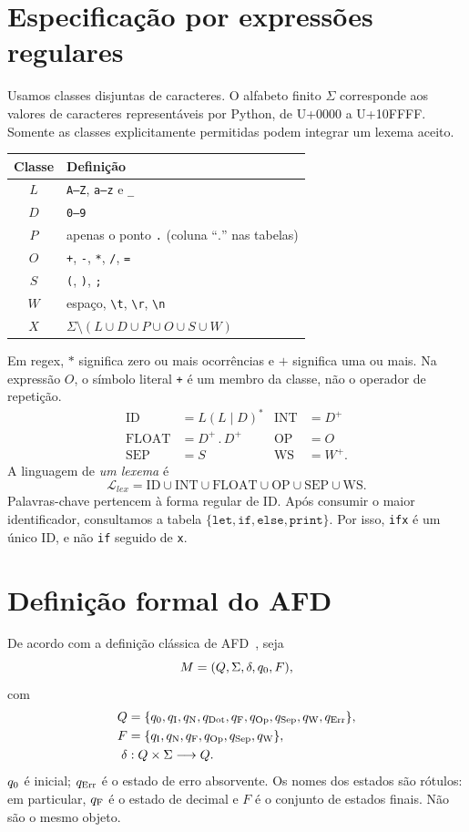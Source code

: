 \documentclass[12pt,a4paper]{article}
\begin{document}
\section{Especificação por expressões regulares}
Usamos classes disjuntas de caracteres. O alfabeto finito $\Sigma$ corresponde
aos valores de caracteres representáveis por Python, de U+0000 a U+10FFFF.
Somente as classes explicitamente permitidas podem integrar um lexema aceito.
\begin{center}
\begin{tabular}{cl}
\toprule Classe & Definição\\\midrule
$L$ & \texttt{A--Z}, \texttt{a--z} e \texttt{\_}\\
$D$ & \texttt{0--9}\\
$P$ & apenas o ponto \texttt{.} (coluna ``$.$'' nas tabelas)\\
$O$ & \texttt{+}, \texttt{-}, \texttt{*}, \texttt{/}, \texttt{=}\\
$S$ & \texttt{(}, \texttt{)}, \texttt{;}\\
$W$ & espaço, \texttt{\textbackslash t}, \texttt{\textbackslash r}, \texttt{\textbackslash n}\\
$X$ & $\Sigma\setminus(L\cup D\cup P\cup O\cup S\cup W)$\\\bottomrule
\end{tabular}
\end{center}
Em regex, $*$ significa zero ou mais ocorrências e $+$ significa uma ou mais.
Na expressão $O$, o símbolo literal \texttt{+} é um membro da classe, não o
operador de repetição.
\begin{align*}
\mathrm{ID}&=L(L\mid D)^* &\mathrm{INT}&=D^+\\
\mathrm{FLOAT}&=D^+\,\texttt{.}\,D^+ &\mathrm{OP}&=O\\
\mathrm{SEP}&=S &\mathrm{WS}&=W^+.
\end{align*}
A linguagem de \emph{um lexema} é
\[
\mathcal{L}_{lex}=\mathrm{ID}\cup\mathrm{INT}\cup\mathrm{FLOAT}
\cup\mathrm{OP}\cup\mathrm{SEP}\cup\mathrm{WS}.
\]
Palavras-chave pertencem à forma regular de ID. Após consumir o maior
identificador, consultamos a tabela
$\{\texttt{let},\texttt{if},\texttt{else},\texttt{print}\}$.
Por isso, \texttt{ifx} é um único ID, e não \texttt{if} seguido de \texttt{x}.

\section{Definição formal do AFD}
De acordo com a definição clássica de AFD~\cite{sipser}, seja
\[
M=(Q,\Sigma,\delta,q_{\mathrm{0}},F),
\]
com
\begin{align*}
Q&=\{q_{\mathrm{0}},q_{\mathrm{I}},q_{\mathrm{N}},q_{\mathrm{Dot}},q_{\mathrm{F}},q_{\mathrm{Op}},q_{\mathrm{Sep}},q_{\mathrm{W}},q_{\mathrm{Err}}\},\\
F&=\{q_{\mathrm{I}},q_{\mathrm{N}},q_{\mathrm{F}},q_{\mathrm{Op}},q_{\mathrm{Sep}},q_{\mathrm{W}}\},\\
\delta&:Q\times\Sigma\longrightarrow Q.
\end{align*}
$q_{\mathrm{0}}$ é inicial; $q_{\mathrm{Err}}$ é o estado de erro absorvente. Os nomes dos estados
são rótulos: em particular, $q_{\mathrm{F}}$ é o estado de decimal e $F$ é o conjunto
de estados finais. Não são o mesmo objeto.
\end{document}
